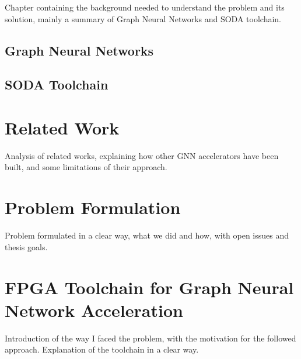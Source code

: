 \documentclass{Configuration_Files/PoliMi3i_thesis}
\begin{document}
    Chapter containing the background needed to understand the problem and its solution, mainly a summary
    of Graph Neural Networks and SODA toolchain.

    \section{Graph Neural Networks}

    \section{SODA Toolchain}




    \chapter{Related Work}
    \label{ch:chapter_three}%

    Analysis of related works, explaining how other GNN accelerators have been built, and some
    limitations of their approach.



    \chapter{Problem Formulation}
    \label{ch:chapter_four}%

    Problem formulated in a clear way, what we did and how, with open issues and thesis goals.



    \chapter{FPGA Toolchain for Graph Neural Network Acceleration}
    \label{ch:chapter_five}%

    Introduction of the way I faced the problem, with the motivation for the followed approach.
    Explanation of the toolchain in a clear way.
\end{document}
